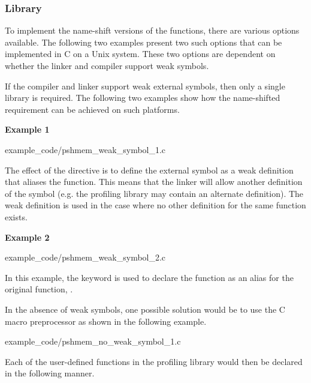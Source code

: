 \subsubsection{\openshmem Library}
\label{sec:pshmem_example_library}
To implement the name-shift versions of the \openshmem functions, 
there are various options available. The following two examples 
present two such options that can be implemented in C on a Unix 
system. These two options are dependent on whether the linker 
and compiler support weak symbols. 

If the compiler and linker support weak external symbols, then 
only a single library is required. The following two examples show 
how the name-shifted requirement can be achieved on such platforms. 

\noindent\textbf{Example 1}


      {example_code/pshmem_weak_symbol_1.c}

The effect of the  directive is to define the 
external symbol  as a weak definition that 
aliases the  function. This 
means that the linker will allow another definition 
of the symbol (e.g. the profiling library may contain an alternate 
definition). The weak definition is used in the case where no other 
definition for the same function exists. 

\noindent\textbf{Example 2}


      {example_code/pshmem_weak_symbol_2.c}

In this example, the keyword  is used to 
declare the  function as an alias for 
the original function, .

In the absence of weak symbols, one possible solution would be to 
use the C macro preprocessor as shown in the following example. 


      {example_code/pshmem_no_weak_symbol_1.c}

Each of the user-defined functions in the profiling library would 
then be declared in the following manner. 

